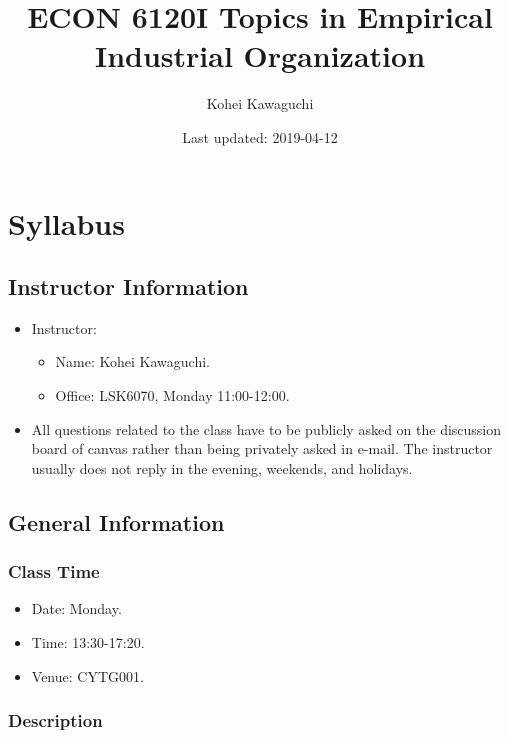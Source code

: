 \documentclass[]{book}
\title{ECON 6120I Topics in Empirical Industrial Organization}
\author{Kohei Kawaguchi}
\date{Last updated: 2019-04-12}
\providecommand{\tightlist}{%
  \setlength{\itemsep}{0pt}\setlength{\parskip}{0pt}}
\begin{document}
\maketitle

{
\setcounter{tocdepth}{1}
\tableofcontents
}
\chapter{Syllabus}\label{syllabus}

\section{Instructor Information}\label{instructor-information}

\begin{itemize}
\tightlist
\item
  Instructor:

  \begin{itemize}
  \tightlist
  \item
    Name: Kohei Kawaguchi.
  \item
    Office: LSK6070, Monday 11:00-12:00.
  \end{itemize}
\item
  All questions related to the class have to be publicly asked on the
  discussion board of canvas rather than being privately asked in
  e-mail. The instructor usually does not reply in the evening,
  weekends, and holidays.
\end{itemize}

\section{General Information}\label{general-information}

\subsection{Class Time}\label{class-time}

\begin{itemize}
\tightlist
\item
  Date: Monday.
\item
  Time: 13:30-17:20.
\item
  Venue: CYTG001.
\end{itemize}

\subsection{Description}\label{description}
\end{document}
